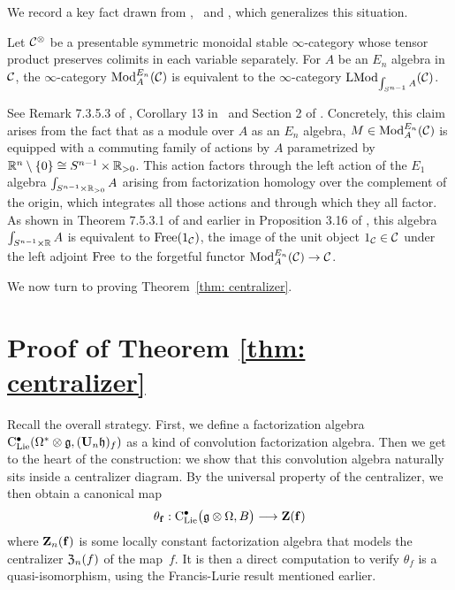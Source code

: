 \documentclass[11pt]{amsart}
\numberwithin{equation}{section}
\begin{document}
We record a key fact drawn from \cite{LurieHA},~\cite{FrancisHH}  and \cite{GG-Notes}, which generalizes this situation.

\begin{prp}
\label{P:ModentoModSn}
Let $\mathcal C^\otimes$ be a presentable symmetric monoidal stable $\infty$-category whose tensor product preserves colimits in each variable separately.
For $A$ be an $E_n$ algebra in $\mathcal C$,
the $\infty$-category ${\rm Mod}^{E_n}_A(\mathcal C)$ is equivalent to the $\infty$-category ${\rm LMod}_{{\int_{S^{n-1}} A}}(\mathcal C)$.
\end{prp}

See Remark 7.3.5.3 of \cite{LurieHA}, Corollary 13 in~\cite{GG-Notes} and Section 2 of \cite{FrancisHH}.
Concretely, this claim arises from the fact that as a module over $A$ as an $E_n$ algebra, 
$M \in {\rm Mod}^{E_n}_A(\mathcal C)$ is equipped with a commuting family of actions by $A$ parametrized by $\mathbb R^n \setminus \{0\}\cong S^{n-1} \times \mathbb R_{>0}$.
This action factors through the left action of the $E_1$ algebra $\int_{S^{n-1} \times \mathbb R_{>0}} A$ arising from factorization homology over the complement of the origin,
which integrates all those actions and through which they all factor. 
As shown in Theorem 7.5.3.1 of \cite{LurieHA} and earlier in Proposition 3.16 of \cite{FrancisHH}, 
this algebra $\int_{S^{n-1} \times \mathbb R} A$ is equivalent to ${\rm Free}(1_\mathcal C)$, 
the image of the unit object $1_\mathcal C \in \mathcal C$ under the left adjoint ${\rm Free}$ to the forgetful functor ${\rm Mod}^{E_n}_A(\mathcal C) \to \mathcal C$.

We now turn to proving Theorem~\ref{thm: centralizer}.

\section{Proof of Theorem \ref{thm: centralizer}}

Recall the overall strategy.
First, we define a factorization algebra ${\rm C}_{\rm Lie}^\bullet(\Omega^* \otimes \mathfrak g, (\mathbf U_n \mathfrak h)_f)$ as a kind of convolution factorization algebra.
Then we get to the heart of the construction:
we show that this convolution algebra naturally sits inside a centralizer diagram.
By the universal property of the centralizer, we then obtain 
a canonical map 
\[
\theta_{{\bf f}}: {\rm C}_{\rm Lie}^\bullet\big(\mathfrak g\otimes \Omega , B \big) \longrightarrow  \mathbf Z(\mathbf{f})
\]
where $\mathbf Z_n(\mathbf{f})$ is some locally constant factorization algebra that models the centralizer ${\frak Z}_n(f)$ of the map~$f$.
It is then a direct computation to verify $\theta_f$ is a quasi-isomorphism,
using the Francis-Lurie result mentioned earlier.
\end{document}
